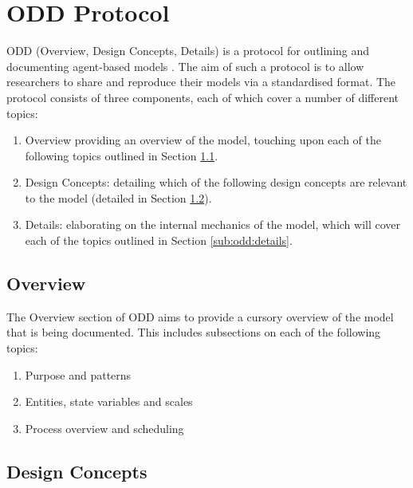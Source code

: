 \section{ODD Protocol}
\label{sec:odd}

ODD (Overview, Design Concepts, Details) is a protocol for outlining and
documenting agent-based models
\cite{grimm2006standard,grimm2010odd,grimm2020odd}.
The aim of such a protocol is to allow researchers to share and reproduce their
models via a standardised format.
The protocol consists of three components, each of which cover a number of
different topics:
\begin{enumerate}
    \item Overview providing an overview of the model, touching upon each of the
        following topics outlined in Section \ref{sub:odd:overview}.
    \item Design Concepts: detailing which of the following design concepts are
        relevant to the model (detailed in Section
        \ref{sub:odd:design_concepts}).
    \item Details: elaborating on the internal mechanics of the model, which
        will cover each of the topics outlined in Section \ref{sub:odd:details}.
\end{enumerate}

\subsection{Overview}
\label{sub:odd:overview}

The Overview section of ODD aims to provide a cursory overview of the model that
is being documented.
This includes subsections on each of the following topics:
\begin{enumerate}
    \item Purpose and patterns
    \item Entities, state variables and scales
    \item Process overview and scheduling
\end{enumerate}

\subsection{Design Concepts}
\label{sub:odd:design_concepts}

